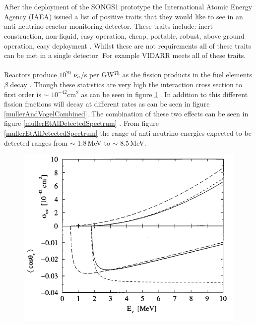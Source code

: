 \\\\After the deployment of the SONGS1 prototype the International Atomic Energy Agency (IAEA) issued a list of positive traits that they would like to see in an anti-neutrino reactor monitoring detector. These traits include: inert construction, non-liquid, easy operation, cheap, portable, robust, above ground operation, easy deployment \cite{IAEA_2008}. Whilst these are not requirements all of these traits can be met in a single detector. For example VIDARR meets all of these traits. 
\\\\Reactors produce $10^{20}$ $\Bar{\nu_e}$/s per GW$^{Th}$ as the fission products in the fuel elements $\beta$ decay \cite{Mueller_2011}. Though these statistics are very high the interaction cross section to first order is $\sim$ $10^{-42}$cm$^2$ as can be seen in figure \ref{vogelAndBeacomCrossSection} \cite{Vogel_1999}. In addition to this different fission fractions will decay at different rates as can be seen in figure \ref{mullerAndVogelCombined}. The combination of these two effects can be seen in figure \ref{mullerEtAlDetectedSpectrum} \cite{Mueller_2011}. From figure \ref{mullerEtAlDetectedSpectrum} the range of anti-neutrino energies expected to be detected ranges from $\sim$ 1.8\,MeV to $\sim$ 8.5\,MeV.
\begin{figure}[htbp]
 \centering
 \includegraphics[width=120mm]{Chapter1/Figs/Raster/vogelAndBeacomCrossSection.png} %
 \label{vogelAndBeacomCrossSection}
\end{figure}
